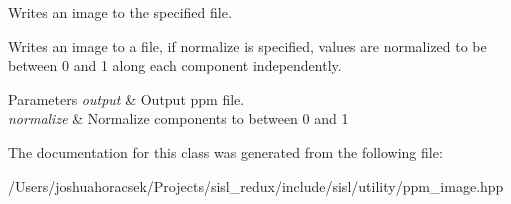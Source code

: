 Writes an image to the specified file. 

Writes an image to a file, if normalize is specified, values are normalized to be between 0 and 1 along each component independently.


\begin{DoxyParams}{Parameters}
{\em output} & Output ppm file. \\
\hline
{\em normalize} & Normalize components to between 0 and 1 \\
\hline
\end{DoxyParams}


The documentation for this class was generated from the following file\+:\begin{DoxyCompactItemize}
\item 
/\+Users/joshuahoracsek/\+Projects/sisl\+\_\+redux/include/sisl/utility/ppm\+\_\+image.\+hpp\end{DoxyCompactItemize}
